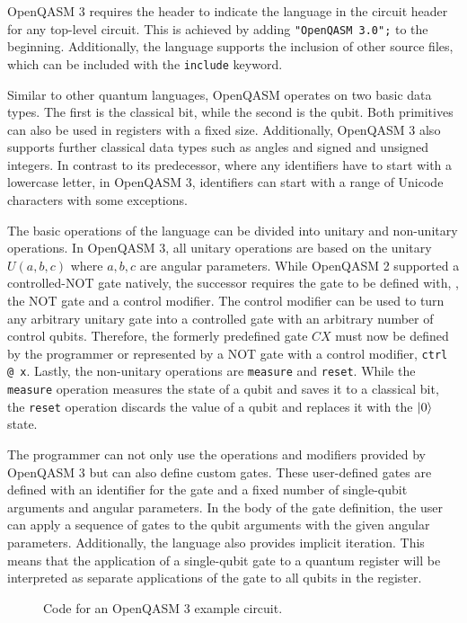 OpenQASM 3 requires the header to indicate the language in the circuit header for any top-level circuit. This is achieved by adding \texttt{"OpenQASM 3.0";} to the beginning. Additionally, the language supports the inclusion of other source files, which can be included with the \texttt{include} keyword.

Similar to other quantum languages, OpenQASM operates on two basic data types. The first is the classical bit, while the second is the qubit. Both primitives can also be used in registers with a fixed size. Additionally, OpenQASM 3 also supports further classical data types such as angles and signed and unsigned integers.
In contrast to its predecessor, where any identifiers have to start with a lowercase letter, in OpenQASM 3, identifiers can start with a range of Unicode characters with some exceptions. 

The basic operations of the language can be divided into unitary and non-unitary operations. In OpenQASM 3, all unitary operations are based on the unitary $U(a,b,c)$ where $a,b,c$ are angular parameters.
While OpenQASM 2 supported a controlled-NOT gate natively, the successor requires the gate to be defined with, \eg, the NOT gate and a control modifier. The control modifier can be used to turn any arbitrary unitary gate into a controlled gate with an arbitrary number of control qubits. Therefore, the formerly predefined gate $CX$ must now be defined by the programmer or represented by a NOT gate with a control modifier, \eg \texttt{ctrl @ x}. Lastly, the non-unitary operations are \texttt{measure} and \texttt{reset}. While the \texttt{measure} operation measures the state of a qubit and saves it to a classical bit, the \texttt{reset} operation discards the value of a qubit and replaces it with the $\ket{0}$ state.

The programmer can not only use the operations and modifiers provided by OpenQASM 3 but can also define custom gates. These user-defined gates are defined with an identifier for the gate and a fixed number of single-qubit arguments and angular parameters. In the body of the gate definition, the user can apply a sequence of gates to the qubit arguments with the given angular parameters. Additionally, the language also provides implicit iteration. This means that the application of a single-qubit gate to a quantum register will be interpreted as separate applications of the gate to all qubits in the register.

\begin{figure}[htp]
    \centering     
    
    \caption{Code for an OpenQASM 3 example circuit.}
    \label{fig:qasm_example}
\end{figure}

